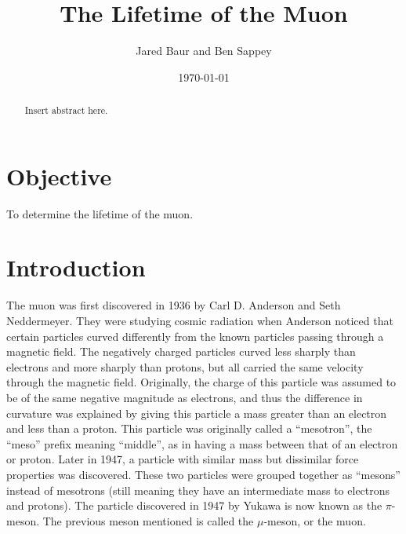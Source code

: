 \documentclass[%
 aip,
 amsmath,amssymb,
 reprint,%
floatfix,
]{revtex4-1}
\begin{document}

\title[]{The Lifetime of the Muon}

\author{Jared Baur and Ben Sappey}

\date{\today}%


\begin{abstract}

	Insert abstract here.

\end{abstract}

\maketitle


\onecolumngrid

\section{\label{sec:level1}Objective}

To determine the lifetime of the muon.

\section{\label{sec:level2}Introduction}

The muon was first discovered in 1936 by Carl D. Anderson and Seth Neddermeyer. They were studying cosmic radiation when Anderson noticed that certain particles curved differently from the known particles passing through a magnetic field. The negatively charged particles curved less sharply than electrons and more sharply than protons, but all carried the same velocity through the magnetic field. Originally, the charge of this particle was assumed to be of the same negative magnitude as electrons, and thus the difference in curvature was explained by giving this particle a mass greater than an electron and less than a proton. This particle was originally called a “mesotron”, the “meso” prefix meaning “middle”, as in having a mass between that of an electron or proton. Later in 1947, a particle with similar mass but dissimilar force properties was discovered. These two particles were grouped together as “mesons” instead of mesotrons (still meaning they have an intermediate mass to electrons and protons). The particle discovered in 1947 by Yukawa is now known as the $\pi$-meson. The previous meson mentioned is called the $\mu$-meson, or the muon.
\end{document}
